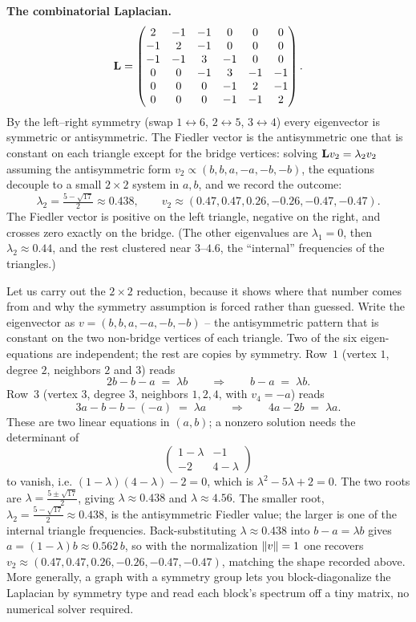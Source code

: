 \textbf{The combinatorial Laplacian.}
\[
  \mathbf{L}=\begin{pmatrix}
   2 & -1 & -1 & 0 & 0 & 0\\
  -1 & 2 & -1 & 0 & 0 & 0\\
  -1 & -1 & 3 & -1 & 0 & 0\\
   0 & 0 & -1 & 3 & -1 & -1\\
   0 & 0 & 0 & -1 & 2 & -1\\
   0 & 0 & 0 & -1 & -1 & 2
  \end{pmatrix}.
\]
By the left--right symmetry (swap $1\leftrightarrow6$, $2\leftrightarrow5$, $3\leftrightarrow4$) every eigenvector is symmetric or antisymmetric. The Fiedler vector is the antisymmetric one that is constant on each triangle except for the bridge vertices: solving $\mathbf{L} v_2=\lambda_2 v_2$ assuming the antisymmetric form $v_2\propto(b,b,a,-a,-b,-b)$, the equations decouple to a small $2\times2$ system in $a,b$, and we record the outcome:
\[
  \lambda_2 = \tfrac{5-\sqrt{17}}{2}\approx 0.438,\qquad v_2\approx(0.47,0.47,0.26,-0.26,-0.47,-0.47).
\]
The Fiedler vector is positive on the left triangle, negative on the right, and crosses zero exactly on the bridge. (The other eigenvalues are $\lambda_1=0$, then $\lambda_2\approx0.44$, and the rest clustered near $3$--$4.6$, the ``internal'' frequencies of the triangles.)

Let us carry out the $2\times2$ reduction, because it shows where that number comes from and why the symmetry assumption is forced rather than guessed. Write the eigenvector as $v=(b,b,a,-a,-b,-b)$ -- the antisymmetric pattern that is constant on the two non-bridge vertices of each triangle. Two of the six eigen-equations are independent; the rest are copies by symmetry. Row~$1$ (vertex $1$, degree $2$, neighbors $2$ and $3$) reads
\[
  2b - b - a \;=\; \lambda b
  \qquad\Longrightarrow\qquad
  b - a \;=\; \lambda b .
\]
Row~$3$ (vertex $3$, degree $3$, neighbors $1,2,4$, with $v_4=-a$) reads
\[
  3a - b - b - (-a) \;=\; \lambda a
  \qquad\Longrightarrow\qquad
  4a - 2b \;=\; \lambda a .
\]
These are two linear equations in $(a,b)$; a nonzero solution needs the determinant of
\[
  \begin{pmatrix} 1-\lambda & -1 \\ -2 & 4-\lambda \end{pmatrix}
\]
to vanish, i.e. $(1-\lambda)(4-\lambda)-2=0$, which is $\lambda^2-5\lambda+2=0$. The two roots are $\lambda=\tfrac{5\pm\sqrt{17}}{2}$, giving $\lambda\approx 0.438$ and $\lambda\approx 4.56$. The smaller root, $\lambda_2=\tfrac{5-\sqrt{17}}{2}\approx 0.438$, is the antisymmetric Fiedler value; the larger is one of the internal triangle frequencies. Back-substituting $\lambda\approx0.438$ into $b-a=\lambda b$ gives $a=(1-\lambda)b\approx 0.562\,b$, so with the normalization $\lVert v\rVert=1$ one recovers $v_2\approx(0.47,0.47,0.26,-0.26,-0.47,-0.47)$, matching the shape recorded above. More generally, a graph with a symmetry group lets you block-diagonalize the Laplacian by symmetry type and read each block's spectrum off a tiny matrix, no numerical solver required.


